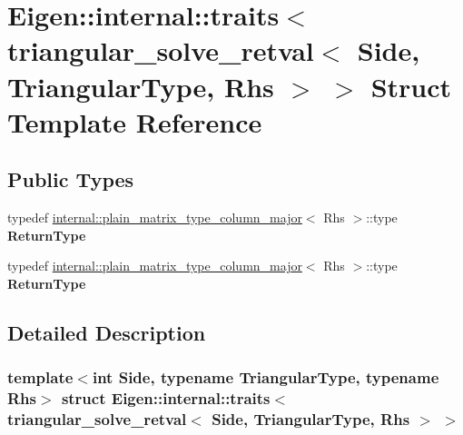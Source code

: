 \hypertarget{struct_eigen_1_1internal_1_1traits_3_01triangular__solve__retval_3_01_side_00_01_triangular_type_00_01_rhs_01_4_01_4}{}\section{Eigen\+:\+:internal\+:\+:traits$<$ triangular\+\_\+solve\+\_\+retval$<$ Side, Triangular\+Type, Rhs $>$ $>$ Struct Template Reference}
\label{struct_eigen_1_1internal_1_1traits_3_01triangular__solve__retval_3_01_side_00_01_triangular_type_00_01_rhs_01_4_01_4}
\subsection*{Public Types}
\begin{DoxyCompactItemize}
\item 
\mbox{\label{struct_eigen_1_1internal_1_1traits_3_01triangular__solve__retval_3_01_side_00_01_triangular_type_00_01_rhs_01_4_01_4_abc717df63c78808ab97f24831f702190}} 
typedef \hyperlink{struct_eigen_1_1internal_1_1plain__matrix__type__column__major}{internal\+::plain\+\_\+matrix\+\_\+type\+\_\+column\+\_\+major}$<$ Rhs $>$\+::type {\bfseries Return\+Type}
\item 
\mbox{\label{struct_eigen_1_1internal_1_1traits_3_01triangular__solve__retval_3_01_side_00_01_triangular_type_00_01_rhs_01_4_01_4_abc717df63c78808ab97f24831f702190}} 
typedef \hyperlink{struct_eigen_1_1internal_1_1plain__matrix__type__column__major}{internal\+::plain\+\_\+matrix\+\_\+type\+\_\+column\+\_\+major}$<$ Rhs $>$\+::type {\bfseries Return\+Type}
\end{DoxyCompactItemize}


\subsection{Detailed Description}
\subsubsection*{template$<$int Side, typename Triangular\+Type, typename Rhs$>$\newline
struct Eigen\+::internal\+::traits$<$ triangular\+\_\+solve\+\_\+retval$<$ Side, Triangular\+Type, Rhs $>$ $>$}



